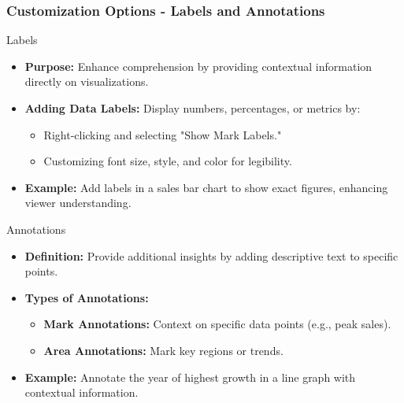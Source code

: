 \documentclass[aspectratio=169]{beamer}
\begin{document}
\begin{frame}[fragile]
    \frametitle{Customization Options - Labels and Annotations}
    \begin{block}{Labels}
        \begin{itemize}
            \item \textbf{Purpose:} Enhance comprehension by providing contextual information directly on visualizations.
            
            \item \textbf{Adding Data Labels:} 
                Display numbers, percentages, or metrics by:
                \begin{itemize}
                    \item Right-clicking and selecting "Show Mark Labels."
                    \item Customizing font size, style, and color for legibility.
                \end{itemize}
            
            \item \textbf{Example:} 
                Add labels in a sales bar chart to show exact figures, enhancing viewer understanding.
        \end{itemize}
    \end{block}
    
    \begin{block}{Annotations}
        \begin{itemize}
            \item \textbf{Definition:} Provide additional insights by adding descriptive text to specific points.
            
            \item \textbf{Types of Annotations:}
                \begin{itemize}
                    \item \textbf{Mark Annotations:} Context on specific data points (e.g., peak sales).
                    \item \textbf{Area Annotations:} Mark key regions or trends.
                \end{itemize}
            
            \item \textbf{Example:} 
                Annotate the year of highest growth in a line graph with contextual information.
        \end{itemize}
    \end{block}
\end{frame}
\end{document}
